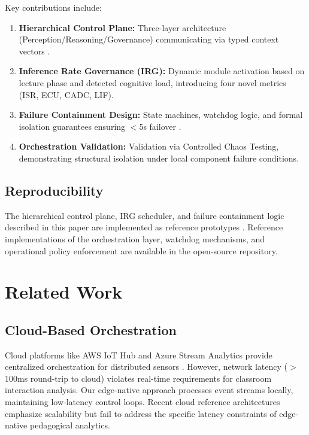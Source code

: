 \documentclass[conference]{IEEEtran}
\begin{document}
Key contributions include:
\begin{enumerate}
    \item \textbf{Hierarchical Control Plane:} Three-layer architecture (Perception/Reasoning/Governance) communicating via typed context vectors \cite{b17}. 
    \item \textbf{Inference Rate Governance (IRG):} Dynamic module activation based on lecture phase and detected cognitive load, introducing four novel metrics (ISR, ECU, CADC, LIF).
    \item \textbf{Failure Containment Design:} State machines, watchdog logic, and formal isolation guarantees ensuring $<$5s failover \cite{b18}.
    \item \textbf{Orchestration Validation:} Validation via Controlled Chaos Testing, demonstrating structural isolation under local component failure conditions.
\end{enumerate}

\subsection{Reproducibility}
The hierarchical control plane, IRG scheduler, and failure containment logic described in this paper are implemented as reference prototypes \cite{scholarmaster_repo}. Reference implementations of the orchestration layer, watchdog mechanisms, and operational policy enforcement are available in the open-source repository.

\section{Related Work}

\subsection{Cloud-Based Orchestration}
Cloud platforms like AWS IoT Hub and Azure Stream Analytics provide centralized orchestration for distributed sensors \cite{b6}. However, network latency ($>$100ms round-trip to cloud) violates real-time requirements for classroom interaction analysis. Our edge-native approach processes event streams locally, maintaining low-latency control loops. Recent cloud reference architectures emphasize scalability but fail to address the specific latency constraints of edge-native pedagogical analytics.
\end{document}
